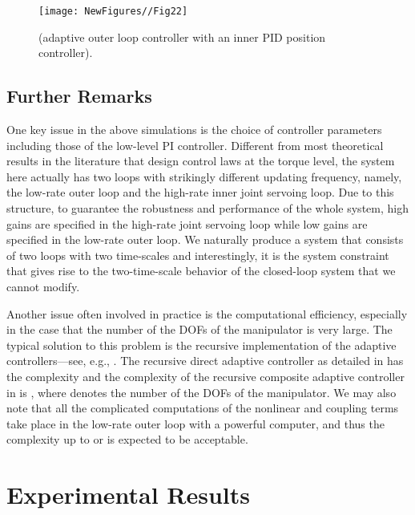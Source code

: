 \documentclass[9pt,technote]{IEEEtran}
\begin{document}
{\begin{figure}
\centering
\begin{minipage}[t]{1.0\linewidth}
\centering
\texttt{[image: NewFigures//Fig22]}
\caption{ (adaptive outer loop controller with an inner PID position controller).}\label{fig:side:a}
\end{minipage}\end{figure}

\subsection{Further Remarks}

One key issue in the above simulations is the choice of controller parameters including those of the low-level PI controller. Different from most theoretical results in the literature that design control laws at the torque level, the system here actually has two loops with strikingly different updating frequency, namely, the low-rate outer loop and the high-rate inner joint servoing loop. Due to this structure, to guarantee the robustness and performance of the whole system, high gains are specified in the high-rate joint servoing loop while low gains are specified in the low-rate outer loop. We naturally produce a system that consists of two loops with two time-scales and interestingly, it is the system constraint that gives rise to the two-time-scale behavior of the closed-loop system that we cannot modify.


Another issue often involved in practice is the computational efficiency, especially in the case that the number of the DOFs of the manipulator is very large. The typical solution to this problem is the recursive implementation of the adaptive controllers---see, e.g., \cite{Niemeyer1991_IJRR,Wang2010_CCC,Wang2013_ASME}. The recursive direct adaptive controller as detailed in \cite{Niemeyer1991_IJRR,Wang2010_CCC} has the complexity  and the complexity of the recursive composite adaptive controller in \cite{Wang2013_ASME} is , where  denotes the number of the DOFs of the manipulator. We may also note that all the complicated computations of the nonlinear and coupling terms take place in the low-rate outer loop with a powerful computer, and thus the complexity up to  or  is expected to be acceptable.

\section{Experimental Results}

}
\end{document}

